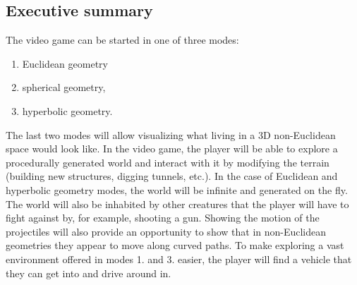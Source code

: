 \subsection{Executive summary}

The video game can be started in one of three modes:
\begin{enumerate}
    \item Euclidean geometry
    \item spherical geometry,
    \item hyperbolic geometry.
\end{enumerate}
The last two modes will allow visualizing what living in a 3D non-Euclidean space would look like.
In the video game, the player will be able to explore a procedurally generated world and interact with it by modifying the terrain (building new structures, digging tunnels, etc.).
In the case of Euclidean and hyperbolic geometry modes, the world will be infinite and generated on the fly.
The world will also be inhabited by other creatures that the player will have to fight against by, for example, shooting a gun.
Showing the motion of the projectiles will also provide an opportunity to show that in non-Euclidean geometries they appear to move along curved paths.
To make exploring a vast environment offered in modes 1. and 3. easier, the player will find a vehicle that they can get into and drive around in.





